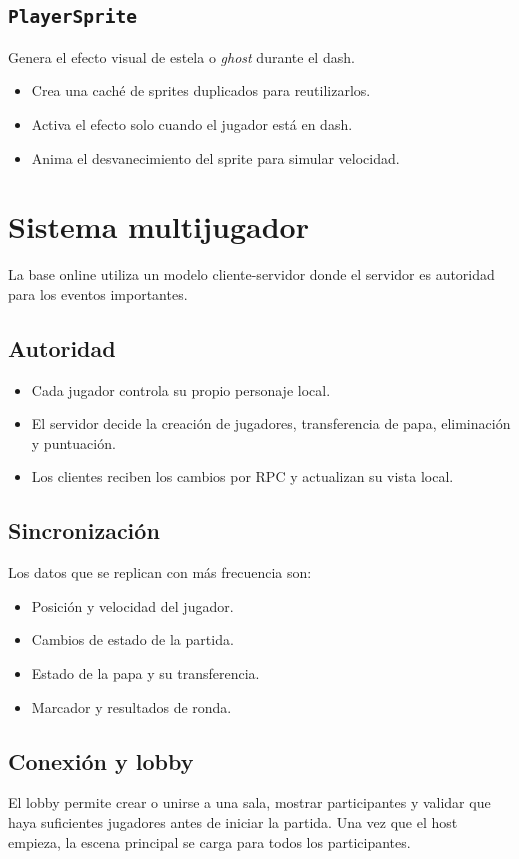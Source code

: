 \documentclass[11pt,a4paper]{article}
\begin{document}
\subsection{\texttt{PlayerSprite}}
Genera el efecto visual de estela o \emph{ghost} durante el dash.
\begin{itemize}[nosep]
    \item Crea una caché de sprites duplicados para reutilizarlos.
    \item Activa el efecto solo cuando el jugador está en dash.
    \item Anima el desvanecimiento del sprite para simular velocidad.
\end{itemize}

\section{Sistema multijugador}
La base online utiliza un modelo cliente-servidor donde el servidor es autoridad para los eventos importantes.

\subsection{Autoridad}
\begin{itemize}[nosep]
    \item Cada jugador controla su propio personaje local.
    \item El servidor decide la creación de jugadores, transferencia de papa, eliminación y puntuación.
    \item Los clientes reciben los cambios por RPC y actualizan su vista local.
\end{itemize}

\subsection{Sincronización}
Los datos que se replican con más frecuencia son:
\begin{itemize}[nosep]
    \item Posición y velocidad del jugador.
    \item Cambios de estado de la partida.
    \item Estado de la papa y su transferencia.
    \item Marcador y resultados de ronda.
\end{itemize}

\subsection{Conexión y lobby}
El lobby permite crear o unirse a una sala, mostrar participantes y validar que haya suficientes jugadores antes de iniciar la partida. Una vez que el host empieza, la escena principal se carga para todos los participantes.
\end{document}

